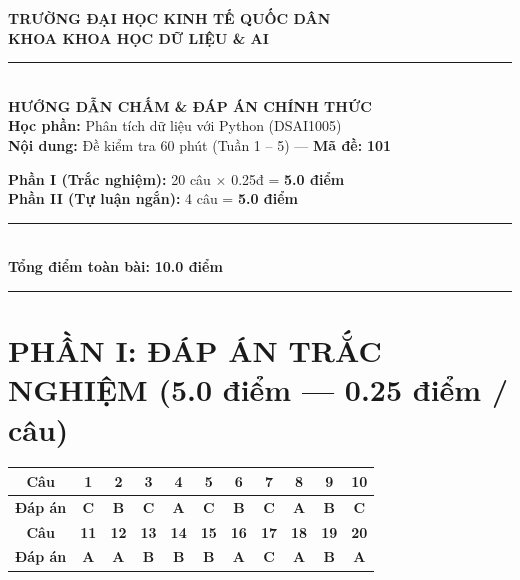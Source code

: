 \documentclass[11pt,a4paper]{article}
\begin{document}
\noindent
\begin{minipage}[t]{0.55\textwidth}
  \centering
  \textbf{TRƯỜNG ĐẠI HỌC KINH TẾ QUỐC DÂN}\\
  \textbf{KHOA KHOA HỌC DỮ LIỆU \& AI}\\
  \rule{4cm}{0.4pt}\\[2mm]
  \textbf{HƯỚNG DẪN CHẤM \& ĐÁP ÁN CHÍNH THỨC}\\
  \textbf{Học phần:} Phân tích dữ liệu với Python (DSAI1005)\\
  \textbf{Nội dung:} Đề kiểm tra 60 phút (Tuần 1 -- 5) --- \textbf{Mã đề:} \textbf{101}
\end{minipage}
\hfill
\begin{minipage}[t]{0.42\textwidth}
  \begin{tcolorbox}[colback=blue!5!white,colframe=blue!75!black,title=\textbf{Tổng quan thang điểm 10}]
    \small
    \textbf{Phần I (Trắc nghiệm):} 20 câu $\times$ 0.25đ = \textbf{5.0 điểm}\\
    \textbf{Phần II (Tự luận ngắn):} 4 câu = \textbf{5.0 điểm}\\
    \rule{\linewidth}{0.3pt}\\
    \textbf{Tổng điểm toàn bài:} \textbf{10.0 điểm}
  \end{tcolorbox}
\end{minipage}

\vspace{3mm}
\hrule
\vspace{2mm}

\section*{PHẦN I: ĐÁP ÁN TRẮC NGHIỆM (5.0 điểm --- 0.25 điểm / câu)}

\begin{center}
\begin{tabular}{|c|c|c|c|c|c|c|c|c|c|c|}
  \hline
  \textbf{Câu} & \textbf{1} & \textbf{2} & \textbf{3} & \textbf{4} & \textbf{5} & \textbf{6} & \textbf{7} & \textbf{8} & \textbf{9} & \textbf{10} \\
  \hline
  \textbf{Đáp án} & \textbf{C} & \textbf{B} & \textbf{C} & \textbf{A} & \textbf{C} & \textbf{B} & \textbf{C} & \textbf{A} & \textbf{B} & \textbf{C} \\
  \hline
  \hline
  \textbf{Câu} & \textbf{11} & \textbf{12} & \textbf{13} & \textbf{14} & \textbf{15} & \textbf{16} & \textbf{17} & \textbf{18} & \textbf{19} & \textbf{20} \\
  \hline
  \textbf{Đáp án} & \textbf{A} & \textbf{A} & \textbf{B} & \textbf{B} & \textbf{B} & \textbf{A} & \textbf{C} & \textbf{A} & \textbf{B} & \textbf{A} \\
  \hline
\end{tabular}
\end{center}
\end{document}

